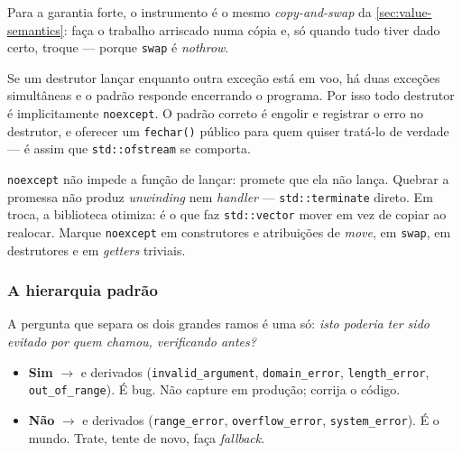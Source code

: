 Para a garantia forte, o instrumento é o mesmo \emph{copy-and-swap} da
\cref{sec:value-semantics}: faça o trabalho arriscado numa cópia e, só quando
tudo tiver dado certo, troque --- porque \texttt{swap} é \emph{nothrow}.

\begin{armadilha}
Se um destrutor lançar enquanto outra exceção está em voo, há duas exceções
simultâneas e o padrão responde encerrando o programa. Por isso todo destrutor é
implicitamente \texttt{noexcept}. O padrão correto é engolir e registrar o erro
no destrutor, e oferecer um \texttt{fechar()} público para quem quiser tratá-lo
de verdade --- é assim que \texttt{std::ofstream} se comporta.
\end{armadilha}

\begin{regra}
\texttt{noexcept} não impede a função de lançar: promete que ela não lança.
Quebrar a promessa não produz \emph{unwinding} nem \emph{handler} ---
\texttt{std::terminate} direto. Em troca, a biblioteca otimiza: é o que faz
\texttt{std::vector} mover em vez de copiar ao realocar. Marque
\texttt{noexcept} em construtores e atribuições de \emph{move}, em
\texttt{swap}, em destrutores e em \emph{getters} triviais.
\end{regra}

\subsubsection{A hierarquia padrão}

A pergunta que separa os dois grandes ramos é uma só: \emph{isto poderia ter
sido evitado por quem chamou, verificando antes?}

\begin{itemize}
    \item \textbf{Sim} $\rightarrow$  e derivados
          (\texttt{invalid\_argument}, \texttt{domain\_error},
          \texttt{length\_error}, \texttt{out\_of\_range}). É bug. Não capture
          em produção; corrija o código.
    \item \textbf{Não} $\rightarrow$  e derivados
          (\texttt{range\_error}, \texttt{overflow\_error},
          \texttt{system\_error}). É o mundo. Trate, tente de novo, faça
          \emph{fallback}.
\end{itemize}

